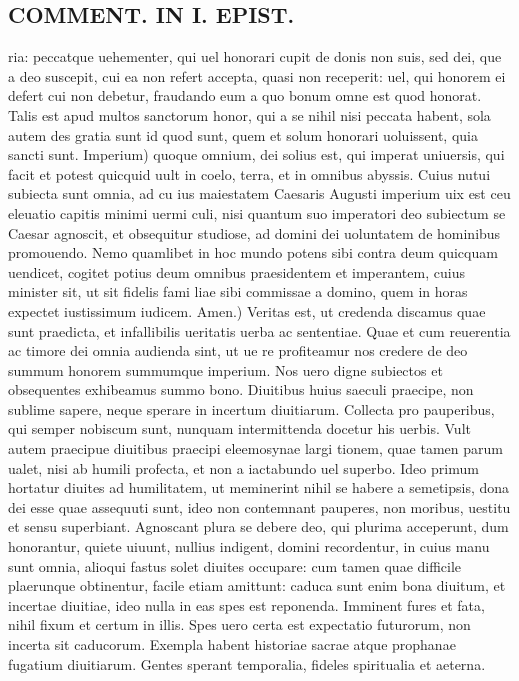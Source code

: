 \documentclass{article}
\begin{document}
\begin{pages}
\section*{COMMENT. IN I. EPIST. }
\marginpar{[ p.540 ]}\pstart ria: peccatque uehementer, qui uel honorari cupit de donis non suis, sed dei, que a deo suscepit, cui ea non refert accepta, quasi non receperit: uel, qui honorem ei defert cui non debetur, fraudando eum a quo bonum omne est quod honorat. Talis est apud multos sanctorum honor, qui a se nihil nisi peccata habent, sola autem des gratia sunt id quod sunt, quem et solum honorari uoluissent, quia sancti sunt. Imperium) quoque omnium, dei solius est, qui imperat uniuersis, qui facit et potest quicquid uult in coelo, terra, et in omnibus abyssis. Cuius nutui subiecta sunt omnia, ad cu ius maiestatem Caesaris Augusti imperium uix est ceu eleuatio capitis minimi uermi culi, nisi quantum suo imperatori deo subiectum se Caesar agnoscit, et obsequitur studiose, ad domini dei uoluntatem de hominibus promouendo. Nemo quamlibet in hoc mundo potens sibi contra deum quicquam uendicet, cogitet potius deum omnibus praesidentem et imperantem, cuius minister sit, ut sit fidelis fami liae sibi commissae a domino, quem in horas expectet iustissimum iudicem. Amen.) Veritas est, ut credenda discamus quae sunt praedicta, et infallibilis ueritatis uerba ac sententiae. Quae et cum reuerentia ac timore dei omnia audienda sint, ut ue re profiteamur nos credere de deo summum honorem summumque imperium. Nos uero digne subiectos et obsequentes exhibeamus summo bono.  \pend\pstart Diuitibus huius saeculi praecipe, non sublime sapere, neque sperare in incertum diuitiarum.  \pend\pstart Collecta pro pauperibus, qui semper nobiscum sunt, nunquam intermittenda docetur his uerbis. Vult autem praecipue diuitibus praecipi eleemosynae largi tionem, quae tamen parum ualet, nisi ab humili profecta, et non a iactabundo uel superbo. Ideo primum hortatur diuites ad humilitatem, ut meminerint nihil se habere a semetipsis, dona dei esse quae assequuti sunt, ideo non contemnant pauperes, non moribus, uestitu et sensu superbiant. Agnoscant plura se debere deo, qui plurima acceperunt, dum honorantur, quiete uiuunt, nullius indigent, domini recordentur, in cuius manu sunt omnia, alioqui fastus solet diuites occupare: cum tamen quae difficile plaerunque obtinentur, facile etiam amittunt: caduca sunt enim bona diuitum, et incertae diuitiae, ideo nulla in eas spes est reponenda. Imminent fures et fata, nihil fixum et certum in illis. Spes uero certa est expectatio futurorum, non incerta sit caducorum. Exempla habent historiae sacrae atque prophanae fugatium diuitiarum. Gentes sperant temporalia, fideles spiritualia et aeterna.  \pend
{}
{}

\end{pages}
\end{document}
